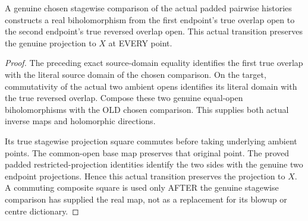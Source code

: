 \begin{theorem}
\label{hir:sharp-actual-endpoint-transition-projection}
\leanok
{}
A genuine chosen stagewise comparison of the actual padded pairwise histories
constructs a real biholomorphism from the first endpoint's true overlap open
to the second endpoint's true reversed overlap open. This actual transition
preserves the genuine projection to $X$ at EVERY point.
\end{theorem}
\begin{proof}
The preceding exact source-domain equality identifies the first true overlap
with the literal source domain of the chosen comparison. On the target,
commutativity of the actual two ambient opens identifies its literal domain
with the true reversed overlap. Compose these two genuine equal-open
biholomorphisms with the OLD chosen comparison. This supplies both actual
inverse maps and holomorphic directions.

Its true stagewise projection square commutes before taking underlying
ambient points. The common-open base map preserves that original point.
The proved padded restricted-projection identities identify the two sides
with the genuine two endpoint projections. Hence this actual transition
preserves the projection to $X$. A commuting composite square is used only
AFTER the genuine stagewise comparison has supplied the real map, not as a
replacement for its blowup or centre dictionary.
\end{proof}

